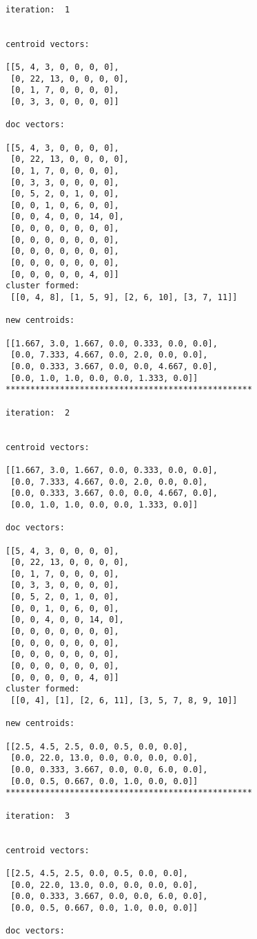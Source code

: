 \documentclass[11pt]{article}
\begin{document}
    \begin{Verbatim}[commandchars=\\\{\}]

iteration:  1 


centroid vectors:

[[5, 4, 3, 0, 0, 0, 0],
 [0, 22, 13, 0, 0, 0, 0],
 [0, 1, 7, 0, 0, 0, 0],
 [0, 3, 3, 0, 0, 0, 0]]

doc vectors:

[[5, 4, 3, 0, 0, 0, 0],
 [0, 22, 13, 0, 0, 0, 0],
 [0, 1, 7, 0, 0, 0, 0],
 [0, 3, 3, 0, 0, 0, 0],
 [0, 5, 2, 0, 1, 0, 0],
 [0, 0, 1, 0, 6, 0, 0],
 [0, 0, 4, 0, 0, 14, 0],
 [0, 0, 0, 0, 0, 0, 0],
 [0, 0, 0, 0, 0, 0, 0],
 [0, 0, 0, 0, 0, 0, 0],
 [0, 0, 0, 0, 0, 0, 0],
 [0, 0, 0, 0, 0, 4, 0]]
cluster formed:
 [[0, 4, 8], [1, 5, 9], [2, 6, 10], [3, 7, 11]]

new centroids:

[[1.667, 3.0, 1.667, 0.0, 0.333, 0.0, 0.0],
 [0.0, 7.333, 4.667, 0.0, 2.0, 0.0, 0.0],
 [0.0, 0.333, 3.667, 0.0, 0.0, 4.667, 0.0],
 [0.0, 1.0, 1.0, 0.0, 0.0, 1.333, 0.0]]
**************************************************

iteration:  2 


centroid vectors:

[[1.667, 3.0, 1.667, 0.0, 0.333, 0.0, 0.0],
 [0.0, 7.333, 4.667, 0.0, 2.0, 0.0, 0.0],
 [0.0, 0.333, 3.667, 0.0, 0.0, 4.667, 0.0],
 [0.0, 1.0, 1.0, 0.0, 0.0, 1.333, 0.0]]

doc vectors:

[[5, 4, 3, 0, 0, 0, 0],
 [0, 22, 13, 0, 0, 0, 0],
 [0, 1, 7, 0, 0, 0, 0],
 [0, 3, 3, 0, 0, 0, 0],
 [0, 5, 2, 0, 1, 0, 0],
 [0, 0, 1, 0, 6, 0, 0],
 [0, 0, 4, 0, 0, 14, 0],
 [0, 0, 0, 0, 0, 0, 0],
 [0, 0, 0, 0, 0, 0, 0],
 [0, 0, 0, 0, 0, 0, 0],
 [0, 0, 0, 0, 0, 0, 0],
 [0, 0, 0, 0, 0, 4, 0]]
cluster formed:
 [[0, 4], [1], [2, 6, 11], [3, 5, 7, 8, 9, 10]]

new centroids:

[[2.5, 4.5, 2.5, 0.0, 0.5, 0.0, 0.0],
 [0.0, 22.0, 13.0, 0.0, 0.0, 0.0, 0.0],
 [0.0, 0.333, 3.667, 0.0, 0.0, 6.0, 0.0],
 [0.0, 0.5, 0.667, 0.0, 1.0, 0.0, 0.0]]
**************************************************

iteration:  3 


centroid vectors:

[[2.5, 4.5, 2.5, 0.0, 0.5, 0.0, 0.0],
 [0.0, 22.0, 13.0, 0.0, 0.0, 0.0, 0.0],
 [0.0, 0.333, 3.667, 0.0, 0.0, 6.0, 0.0],
 [0.0, 0.5, 0.667, 0.0, 1.0, 0.0, 0.0]]

doc vectors:


\end{Verbatim}
\end{document}
